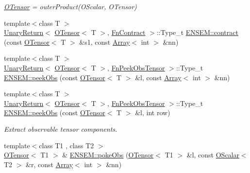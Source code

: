 \begin{DoxyCompactItemize}
\begin{DoxyCompactList}\small\item\em \mbox{\hyperlink{classENSEM_1_1OTensor}{O\+Tensor}} = outer\+Product(\+O\+Scalar, O\+Tensor) \end{DoxyCompactList}\item 
{\footnotesize template$<$class T $>$ }\\\mbox{\hyperlink{structENSEM_1_1UnaryReturn}{Unary\+Return}}$<$ \mbox{\hyperlink{classENSEM_1_1OTensor}{O\+Tensor}}$<$ T $>$, \mbox{\hyperlink{structENSEM_1_1FnContract}{Fn\+Contract}} $>$\+::Type\+\_\+t \mbox{\hyperlink{group__obstensor_ga2c9ce6b1bd52f861eb3ec96cee9d6334}{E\+N\+S\+E\+M\+::contract}} (const \mbox{\hyperlink{classENSEM_1_1OTensor}{O\+Tensor}}$<$ T $>$ \&s1, const \mbox{\hyperlink{classXMLArray_1_1Array}{Array}}$<$ int $>$ \&nn)
\item 
{\footnotesize template$<$class T $>$ }\\\mbox{\hyperlink{structENSEM_1_1UnaryReturn}{Unary\+Return}}$<$ \mbox{\hyperlink{classENSEM_1_1OTensor}{O\+Tensor}}$<$ T $>$, \mbox{\hyperlink{structENSEM_1_1FnPeekObsTensor}{Fn\+Peek\+Obs\+Tensor}} $>$\+::Type\+\_\+t \mbox{\hyperlink{group__obstensor_ga527c1440845b0963c06ccade99d69bf4}{E\+N\+S\+E\+M\+::peek\+Obs}} (const \mbox{\hyperlink{classENSEM_1_1OTensor}{O\+Tensor}}$<$ T $>$ \&l, const \mbox{\hyperlink{classXMLArray_1_1Array}{Array}}$<$ int $>$ \&nn)
\item 
{\footnotesize template$<$class T $>$ }\\\mbox{\hyperlink{structENSEM_1_1UnaryReturn}{Unary\+Return}}$<$ \mbox{\hyperlink{classENSEM_1_1OTensor}{O\+Tensor}}$<$ T $>$, \mbox{\hyperlink{structENSEM_1_1FnPeekObsTensor}{Fn\+Peek\+Obs\+Tensor}} $>$\+::Type\+\_\+t \mbox{\hyperlink{group__obstensor_ga9fffee5b1bebf7fa7202b9b11ac11b16}{E\+N\+S\+E\+M\+::peek\+Obs}} (const \mbox{\hyperlink{classENSEM_1_1OTensor}{O\+Tensor}}$<$ T $>$ \&l, int row)
\begin{DoxyCompactList}\small\item\em Extract observable tensor components. \end{DoxyCompactList}\item 
{\footnotesize template$<$class T1 , class T2 $>$ }\\\mbox{\hyperlink{classENSEM_1_1OTensor}{O\+Tensor}}$<$ T1 $>$ \& \mbox{\hyperlink{group__obstensor_gaa0e4faa1f2d2fe041ebdf6ba05a05178}{E\+N\+S\+E\+M\+::poke\+Obs}} (\mbox{\hyperlink{classENSEM_1_1OTensor}{O\+Tensor}}$<$ T1 $>$ \&l, const \mbox{\hyperlink{classENSEM_1_1OScalar}{O\+Scalar}}$<$ T2 $>$ \&r, const \mbox{\hyperlink{classXMLArray_1_1Array}{Array}}$<$ int $>$ \&nn)

\end{DoxyCompactItemize}
